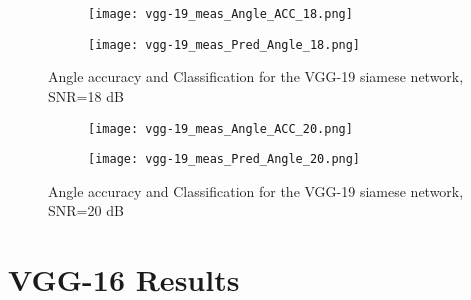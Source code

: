   \begin{figure}[htbp]
    \centering
    \begin{subfigure}{.5\textwidth}
      \centering
      \texttt{[image: vgg-19\_meas\_Angle\_ACC\_18.png]}
    \end{subfigure}%
    \begin{subfigure}{.5\textwidth}
      \centering
      \texttt{[image: vgg-19\_meas\_Pred\_Angle\_18.png]}
    \end{subfigure}
    \caption{Angle accuracy and Classification for the VGG-19 siamese network, SNR=18 dB}
    \label{fig:vgg-19_snr14}
  \end{figure}

  \begin{figure}[htbp]
    \centering
    \begin{subfigure}{.5\textwidth}
      \centering
      \texttt{[image: vgg-19\_meas\_Angle\_ACC\_20.png]}
    \end{subfigure}%
    \begin{subfigure}{.5\textwidth}
      \centering
      \texttt{[image: vgg-19\_meas\_Pred\_Angle\_20.png]}
    \end{subfigure}
    \caption{Angle accuracy and Classification for the VGG-19 siamese network, SNR=20 dB}
    \label{fig:vgg-19_snr15}
  \end{figure}

\chapter{VGG-16 Results}
\label{app:vgg-16_results}

